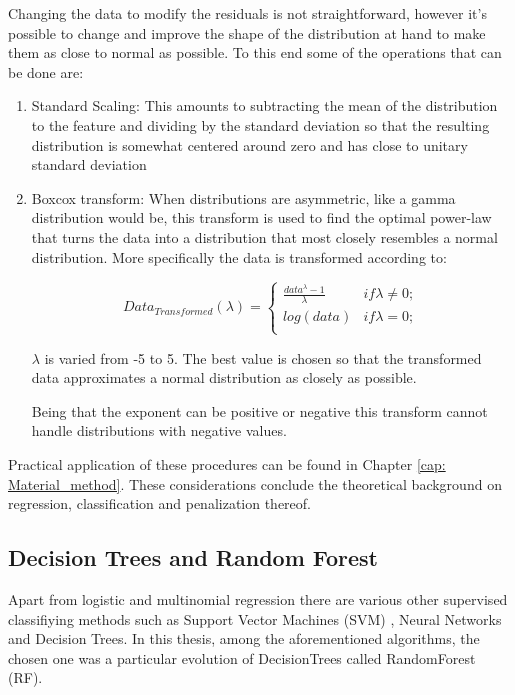Changing the data to modify the residuals is not straightforward, however it's possible to change and improve the shape of the distribution at hand to make them as close to normal as possible.
To this end some of the operations that can be done are:

\begin{enumerate}
\item Standard Scaling: This amounts to subtracting the mean of the distribution to the feature and dividing by the standard deviation so that the resulting distribution is somewhat centered around zero and has close to unitary standard deviation
\item  Boxcox \cite{boxcox} transform: When distributions are asymmetric, like a gamma distribution would be, this transform is used to find the optimal power-law that turns the data into a distribution that most closely resembles a normal distribution. More specifically the data is transformed according to:

\begin{equation}
Data_{Transformed}(\lambda) =
\begin{cases}
	\frac{data^{\lambda} -1}{\lambda} & if \lambda\neq0;\\
	log(data) 					  & if \lambda=0;\\
\end{cases}
\end{equation}

$\lambda$ is varied from -5 to 5. The best value is chosen so that the transformed data approximates a normal distribution as closely as possible.

Being that the exponent can be positive or negative this transform cannot handle distributions with negative values.
\end{enumerate}

Practical application of these procedures can be found in Chapter \ref{cap: Material_method}. These considerations conclude the theoretical background on regression, classification and penalization thereof.

\subsection{Decision Trees and Random Forest}
Apart from logistic and multinomial regression there are various other supervised classifiying methods such as Support Vector Machines (SVM) \cite{SVM}, Neural Networks\cite{ANN} and Decision Trees\cite{DecisionTree}. In this thesis, among the aforementioned algorithms, the chosen one was a particular evolution of DecisionTrees called RandomForest (RF)\cite{RandomForest}.


